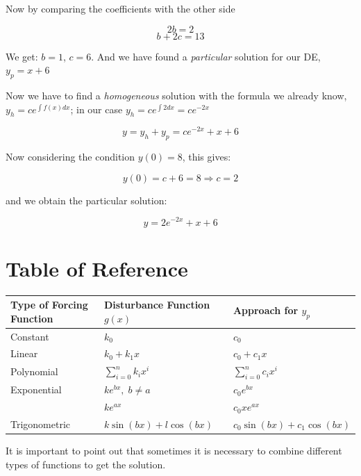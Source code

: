 Now by comparing the coefficients with the other side

\[
    2b = 2
\]
\[
    b + 2c = 13
\]

We get: \(b = 1\), \(c = 6\). And we have found a \emph{particular} solution for our DE,
\(y_p = x + 6\)

Now we have to find a \emph{homogeneous} solution with the formula we already know,
\(y_h = c e^{\int f(x)dx}\); in our case \(y_h = c e^{\int 2dx} = ce^{-2x}\)

\[
    y = y_h + y_p = c e^{-2x} + x + 6
\]

Now considering the condition \( y(0) = 8 \), this gives:

\[
    y(0) = c + 6 = 8 \Rightarrow c = 2
\]

and we obtain the particular solution:

\[
    y = 2 e^{-2x} + x + 6
\]

\section{Table of Reference}
\bigskip
\begin{tabular}{|l|l|l|}
    \hline
    \textbf{Type of Forcing Function} & \textbf{Disturbance Function \( g(x) \)} &
    \textbf{Approach for \( y_p \)}                                                                                    \\
    \hline
    Constant                          & \( k_0 \)                                & \( c_0 \)                           \\
    \hline
    Linear                            & \( k_0 + k_1 x \)                        & \( c_0 + c_1 x \)                   \\
    \hline
    Polynomial                        & \( \sum\limits_{i=0}^{n} k_i x^i \)      & \( \sum\limits_{i=0}^{n} c_i x^i \) \\
    \hline
    Exponential                       & \( k e^{bx}, \; b \ne a \)               & \( c_0 e^{bx} \)                    \\
                                      & \( k e^{ax} \)                           & \( c_0 x e^{ax} \)                  \\
    \hline
    Trigonometric                     & \( k \sin(bx) + l \cos(bx) \)            & \( c_0 \sin(bx) + c_1 \cos(bx) \)   \\
    \hline
\end{tabular}

It is important to point out that sometimes it is necessary to combine different types
of functions to get the solution.

